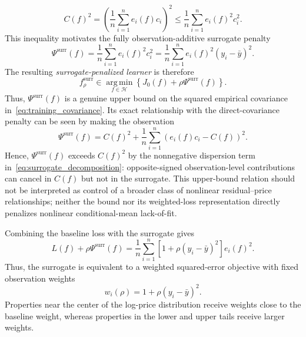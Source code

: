 \documentclass[10pt]{article}
\theoremstyle{definition}
\newcommand{\1}{\mathbf{1}}
\newcommand{\Hcal}{\mathcal{H}}
\newcommand{\argminop}{\operatorname*{arg\,min}}
\begin{document}
{
\begin{equation}
\label{eq:surrogate_upper_bound}
C(f)^2
=
\left(
\frac{1}{n}\sum_{i=1}^n e_i(f)c_i
\right)^2
\leq
\frac{1}{n}\sum_{i=1}^n e_i(f)^2c_i^2.
\end{equation}
}
{This inequality motivates the fully observation-additive surrogate penalty}
\begin{equation}
\label{eq:surrogate}
\Psi^{\mathrm{surr}}(f)
=
\frac{1}{n}\sum_{i=1}^n e_i(f)^2c_i^2
=
\frac{1}{n}\sum_{i=1}^n
e_i(f)^2(y_i-\bar y)^2.
\end{equation}
The resulting \emph{surrogate-penalized learner} is therefore
\begin{equation}
\label{eq:surrogate_learning}
f_\rho^{\mathrm{surr}}
\in
\argminop_{f\in\Hcal}
\left\{
{J_0(f)}
+
\rho\Psi^{\mathrm{surr}}(f)
\right\}.
\end{equation}
{
Thus, $\Psi^{\mathrm{surr}}(f)$ is a genuine upper bound on the squared empirical covariance in~\eqref{eq:training_covariance}. Its exact relationship with the direct-covariance penalty can be seen by making the observation
\begin{equation}
\label{eq:surrogate_decomposition}
\Psi^{\mathrm{surr}}(f)
=
C(f)^2
+
\frac{1}{n}
\sum_{i=1}^n
\left(e_i(f)c_i-C(f)\right)^2.
\end{equation}
Hence, $\Psi^{\mathrm{surr}}(f)$ exceeds $C(f)^2$ by the nonnegative dispersion term in~\eqref{eq:surrogate_decomposition}: opposite-signed observation-level contributions can cancel in $C(f)$ but not in the surrogate. This upper-bound relation should not be interpreted as control of a broader class of nonlinear residual--price relationships; neither the bound nor its weighted-loss representation directly penalizes nonlinear conditional-mean lack-of-fit.
}


Combining the baseline loss with the surrogate gives
\begin{equation}
\label{eq:surrogate_weighted_loss}
L(f)+\rho\Psi^{\mathrm{surr}}(f)
=
\frac{1}{n}\sum_{i=1}^n
\left[1+\rho(y_i-\bar y)^2\right]e_i(f)^2.
\end{equation}
Thus, the surrogate is equivalent to a weighted squared-error objective with fixed observation weights
\begin{equation}
\label{eq:surrogate_weights}
w_i(\rho)=1+\rho(y_i-\bar y)^2.
\end{equation}
Properties near the center of the log-price distribution receive weights close to the baseline weight, whereas properties in the lower and upper tails receive larger weights.
\end{document}
